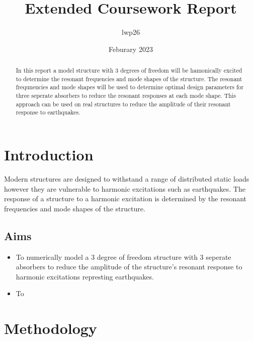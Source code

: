 \documentclass{article}
\begin{document}
\title{Extended Coursework Report}
\author{lwp26}
\date{Feburary 2023}
\maketitle

\begin{abstract}
    \centering
    In this report a model structure with 3 degrees of freedom will be hamonically excited to determine the resonant frequencies and mode shapes of the structure.
    The resonant frequnencies and mode shapes will be used to determine optimal design parameters for three seperate absorbers to reduce the resonant responses at each mode shape.
    This approach can be used on real structures to reduce the amplitude of their resonant response to earthquakes.
\end{abstract}

\section{Introduction}


Modern structures are designed to withstand a range of distributed static loads however they are vulnerable to harmonic excitations such as earthquakes.
The response of a structure to a harmonic excitation is determined by the resonant frequencies and mode shapes of the structure.

\subsection{Aims}

\begin{itemize}
\item To numerically model a 3 degree of freedom structure with 3 seperate absorbers to reduce the amplitude of the structure's resonant response to harmonic excitations represting earthquakes.
\item To
\end{itemize}

\section{Methodology}
\end{document}
